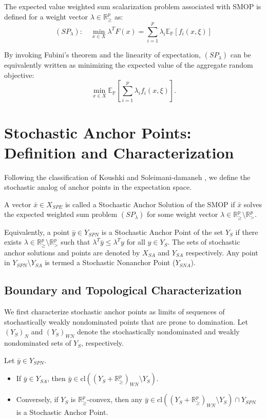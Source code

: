 \documentclass[twoside]{article}
\begin{document}
The expected value weighted sum scalarization problem associated with SMOP is defined for a weight vector $\lambda \in \mathbb{R}^p_{\ge}$ as:
\begin{equation}
(SP_\lambda): \quad \min_{x \in X} \lambda^T F(x) = \sum_{i=1}^p \lambda_i \mathbb{E}_{\mathbb{P}}[f_i(x, \xi)]
\end{equation}

By invoking Fubini's theorem and the linearity of expectation, $(SP_\lambda)$ can be equivalently written as minimizing the expected value of the aggregate random objective: 
$$\min_{x \in X} \mathbb{E}_{\mathbb{P}}[\sum_{i=1}^p \lambda_i f_i(x, \xi)].$$

\section{Stochastic Anchor Points: Definition and Characterization}
Following the classification of Koushki and Soleimani-damaneh \cite{koushki2018}, we define the stochastic analog of anchor points in the expectation space.

\begin{dfn}
	A vector $\bar{x} \in X_{SPE}$ is called a Stochastic Anchor Solution of the SMOP if $\bar{x}$ solves the expected weighted sum problem $(SP_\lambda)$ for some weight vector $\lambda \in \mathbb{R}^p_{\ge} \setminus \mathbb{R}^p_{>}$. 
\end{dfn}

Equivalently, a point $\bar{y} \in Y_{SPN}$ is a Stochastic Anchor Point of the set $Y_S$ if there exists $\lambda \in \mathbb{R}^p_{\ge} \setminus \mathbb{R}^p_{>}$  such that $\lambda^T \bar{y} \le \lambda^T y$ for all $y \in Y_S$. The sets of stochastic anchor solutions and points are denoted by $X_{SA}$ and $Y_{SA}$ respectively. Any point in $Y_{SPN} \setminus Y_{SA}$ is termed a Stochastic Nonanchor Point ($Y_{SNA}$).

\subsection{Boundary and Topological Characterization}
We first characterize stochastic anchor points as limits of sequences of stochastically weakly nondominated points that are prone to domination. Let $(Y_S)_N$ and $(Y_S)_{WN}$ denote the stochastically nondominated and weakly nondominated sets of $Y_S$, respectively.

\begin{thm}
	Let $\bar{y} \in Y_{SPN}$.
	\begin{itemize}
		\item[(i)] If $\bar{y} \in Y_{SA}$, then $\bar{y} \in \text{cl}\left( (Y_S + \mathbb{R}^p_{\ge})_{WN} \setminus Y_S \right)$.
		\item[(ii)] Conversely, if $Y_S$ is $\mathbb{R}^p_{\ge}$-convex, then any $\bar{y} \in \text{cl}\left( (Y_S + \mathbb{R}^p_{\ge})_{WN} \setminus Y_S \right) \cap Y_{SPN}$ is a Stochastic Anchor Point.
	\end{itemize}
\end{thm}
\end{document}
